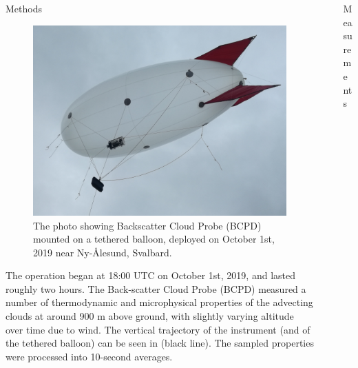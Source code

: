 \documentclass[final]{beamer}
\newlength{\sepwidth}
\newlength{\colwidth}
\newcommand{\separatorcolumn}{\begin{column}{\sepwidth}\end{column}}
\begin{document}
\begin{frame}[t]
\begin{columns}[t]
\begin{column}{\colwidth}
\begin{block}{Methods}
        \begin{figure}
          \centering
          \includegraphics[width=0.8\colwidth]{img/balloon.png}
          \caption{The photo showing Backscatter Cloud Probe (BCPD) mounted on a tethered balloon, deployed on October 1st, 2019 near Ny-\r{A}lesund, Svalbard.}
          \label{fig:01}
        \end{figure}

        The operation began at 18:00 UTC on October 1st, 2019, and lasted roughly two hours. The Back-scatter Cloud Probe (BCPD) measured a number of thermodynamic and microphysical properties of the advecting clouds at around 900 m above ground, with slightly varying altitude over time due to wind. The vertical trajectory of the instrument (and of the tethered balloon) can be seen in  (black line). The sampled properties were processed into 10-second averages.
      \end{block}

    \end{column}
    \separatorcolumn

    \begin{column}{\colwidth}

      \begin{block}{Measurements}


\end{block}
\end{column}
\end{columns}
\end{frame}
\end{document}
